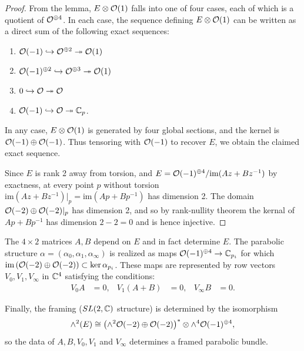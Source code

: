 	\begin{proof}
		From the lemma, $E\otimes \mathcal{O}(1)$ falls into one of four cases, each of which is a quotient of $\mathcal{O}^{\oplus 4}$. In each case, the sequence defining $E\otimes \mathcal{O}(1)$ can be written as a direct sum of the following exact sequences:
		\begin{enumerate}
			\item $\mathcal{O}(-1) \hookrightarrow \mathcal{O}^{\oplus 2}\twoheadrightarrow \mathcal{O}(1) $
			\item $\mathcal{O}(-1)^{\oplus 2} \hookrightarrow \mathcal{O}^{\oplus 3} \twoheadrightarrow \mathcal{O}(1)$
			\item $0 \hookrightarrow \mathcal{O} \twoheadrightarrow \mathcal{O}$
			\item $\mathcal{O}(-1)\hookrightarrow \mathcal{O} \twoheadrightarrow \mathbb{C}_p$.
		\end{enumerate}
		In any case, $E\otimes \mathcal{O}(1)$ is generated by four global sections, and the kernel is $\mathcal{O}(-1)\oplus \mathcal{O}(-1)$. Thus tensoring with $\mathcal{O}(-1)$ to recover $E$, we obtain the claimed exact sequence.
		
		Since $E$ is rank 2 away from torsion, and $E = \mathcal{O}(-1)^{\oplus 4}/\text{im}(Az+Bz^{-1})$ by exactness, at every point $p$ without torsion $\text{im}(Az+Bz^{-1})|_p = \text{im}(Ap+Bp^{-1})$ has dimension 2. The domain $\mathcal{O}(-2)\oplus\mathcal{O}(-2)|_p$ has dimension 2, and so by rank-nullity theorem the kernal of $Ap+Bp^{-1}$ has dimension $2-2=0$ and is hence injective. 
	\end{proof}
	The $4\times2$ matrices $A,B$ depend on $E$ and in fact determine $E$. The parabolic structure $\alpha = (\alpha_0,\alpha_1,\alpha_\infty)$ is realized as maps $\mathcal{O}(-1)^{\oplus 4}\to \mathbb{C}_{p_i}$ for which $\text{im}\left(\mathcal{O}(-2)\oplus\mathcal{O}(-2)\right) \subset \ker\alpha_{p_i}$. These maps are represented by row vectors $V_0,V_1,V_\infty$ in $\mathbb{C}^4$ satisfying the conditions:
	\begin{align}
		\label{e:p3-conds}
		V_0 A &=0, & V_1(A+B) &= 0, & V_\infty B &=0.
	\end{align}
	
	Finally, the framing ($SL(2,\mathbb{C})$ structure) is determined by the isomorphism
	\begin{equation}
		\wedge^2 (E) \cong \left(\wedge^2 \mathcal{O}(-2)\oplus \mathcal{O}(-2)\right)^\ast\otimes \wedge^4\mathcal{O}(-1)^{\oplus 4},
	\end{equation}
	so the data of $A,B, V_0,V_1$ and $V_\infty$ determines a framed parabolic bundle.
	
